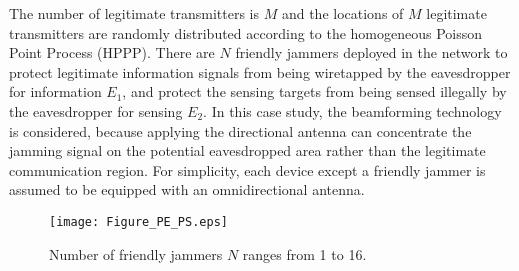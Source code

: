 \documentclass[10pt,journal,twocolumn,twoside]{IEEEtran} %
\begin{document}
The number of legitimate transmitters is $M$ and the locations of $M$ legitimate transmitters are randomly distributed according to the homogeneous Poisson Point Process (HPPP). There are $N$ friendly jammers deployed in the network to protect legitimate information signals from being wiretapped by the eavesdropper for information ${E_1}$, and protect the sensing targets from being sensed illegally by the eavesdropper for sensing ${E_2}$.
In this case study, the beamforming technology is considered, because applying the directional antenna can concentrate the jamming signal on the potential eavesdropped area rather than the legitimate communication region. For simplicity, each device except a friendly jammer is assumed to be equipped with an omnidirectional antenna. 


\begin{figure}[ht]
\centering
\texttt{[image:  Figure\_PE\_PS.eps]}
\caption{Number of friendly jammers $N$ ranges from 1 to 16.}
\label{fig: friendly-jamming_SOP}
\end{figure}
\end{document}
